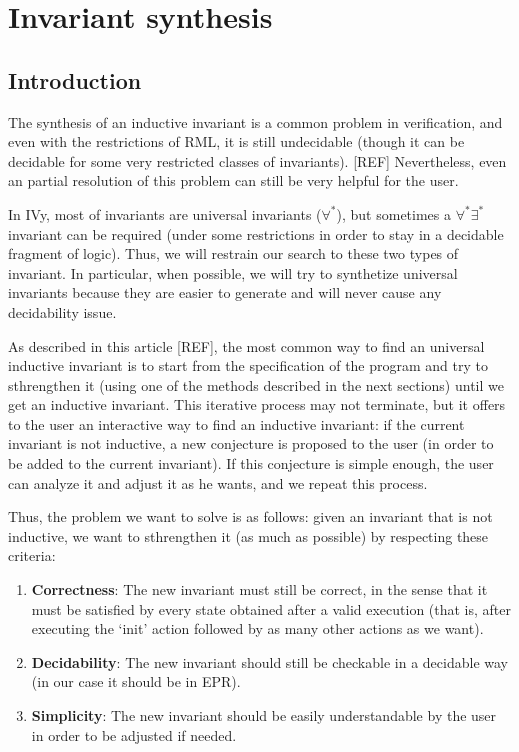 \documentclass[11pt,a4paper,oldfontcommands,openany]{memoir}
\begin{document}
\chapter{Invariant synthesis}

    \section{Introduction}

    The synthesis of an inductive invariant is a common problem in verification, and even with the restrictions of RML, it is still undecidable (though it can be decidable for some very restricted classes of invariants). [REF]
    Nevertheless, even an partial resolution of this problem can still be very helpful for the user.

    In IVy, most of invariants are universal invariants (\(\forall^*\)), but sometimes a \(\forall^*\exists^*\) invariant can be required (under some restrictions in order
    to stay in a decidable fragment of logic). Thus, we will restrain our search to these two types of invariant.
    In particular, when possible, we will try to synthetize universal invariants because they are easier to generate and will never cause any decidability issue.
    
    As described in this article [REF], the most common way to find an universal inductive invariant is to start from the specification of the program
    and try to sthrengthen it (using one of the methods described in the next sections) until we get an inductive invariant.
    This iterative process may not terminate, but it offers to the user an interactive way to find an inductive invariant:
    if the current invariant is not inductive, a new conjecture is proposed to the user (in order to be added to the current invariant).
    If this conjecture is simple enough, the user can analyze it and adjust it as he wants, and we repeat this process.

    Thus, the problem we want to solve is as follows:
    given an invariant that is not inductive, we want to sthrengthen it (as much as possible) by respecting these criteria:
    \begin{enumerate}
        \item \textbf{Correctness}: The new invariant must still be correct, in the sense that it must be satisfied by every state obtained
        after a valid execution (that is, after executing the `init' action followed by as many other actions as we want).
        \item \textbf{Decidability}: The new invariant should still be checkable in a decidable way (in our case it should be in EPR).
        \item \textbf{Simplicity}: The new invariant should be easily understandable by the user in order to be adjusted if needed.
    \end{enumerate}
\end{document}

